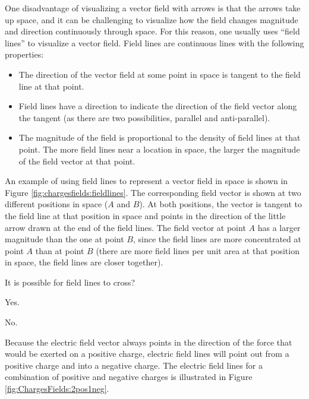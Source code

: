 One disadvantage of visualizing a vector field with arrows is that the arrows take up space, and it can be challenging to visualize how the field changes magnitude and direction continuously through space. For this reason, one usually uses ``field lines'' to visualize a vector field. Field lines are continuous lines with the following properties:
\begin{itemize}
\item The direction of the vector field at some point in space is tangent to the field line at that point.
\item Field lines have a direction to indicate the direction of the field vector along the tangent (as there are two possibilities, parallel and anti-parallel).
\item The magnitude of the field is proportional to the density of field lines at that point. The more field lines near a location in space, the larger the magnitude of the field vector at that point.
\end{itemize}
An example of using field lines to represent a vector field in space is shown in Figure \ref{fig:chargesfields:fieldlines}. The corresponding field vector is shown at two different positions in space ($A$ and $B$). At both positions, the vector is tangent to the field line at that position in space and points in the direction of the little arrow drawn at the end of the field lines. The field vector at point $A$ has a larger magnitude than the one at point $B$, since the field lines are more concentrated at point $A$ than at point $B$ (there are more field lines per unit area at that position in space, the field lines are closer together).
\begin{checkpoint}\label{cp:chargesfields:efield}
\begin{MCquestion}{It is possible for field lines to cross?}
\item Yes.
\item No. \correct
\end{MCquestion}
\end{checkpoint}
Because the electric field vector always points in the direction of the force that would be exerted on a positive charge, electric field lines will point out from a positive charge and into a negative charge. The electric field lines for a combination of positive and negative charges is illustrated in Figure \ref{fig:ChargesFields:2pos1neg}.



